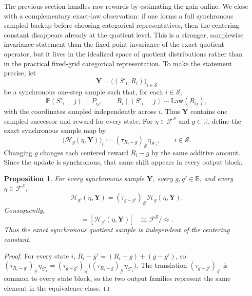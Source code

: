 \documentclass{article}
\newtheorem{proposition}[theorem]{Proposition}
\newcommand{\X}{\mathcal{S}}
\newcommand{\R}{\mathbb{R}}
\begin{document}
The previous section handles raw rewards by estimating the gain online. We close with a complementary exact-law observation: if one forms a full synchronous sampled backup before choosing categorical representatives, then the centering constant disappears already at the quotient level. This is a stronger, samplewise invariance statement than the fixed-point invariance of the exact quotient operator, but it lives in the idealized space of quotient distributions rather than in the practical fixed-grid categorical representation. To make the statement precise, let
\begin{equation}
\mathbf Y = \bigl((S'_i, R_i)\bigr)_{i \in \X}
\end{equation}
be a synchronous one-step sample such that, for each $i \in \X$,
\begin{equation}
\mathbb P(S'_i = j) = P_{ij},\qquad R_i \mid (S'_i=j) \sim \mathrm{Law}(R_{ij}),
\end{equation}
with the coordinates sampled independently across $i$. Thus $\mathbf Y$ contains one sampled successor and reward for every state. For $\eta \in \mathcal F^\X$ and $g \in \R$, define the exact synchronous sample map by
\begin{equation}
\bigl(\mathcal H_g(\eta, \mathbf Y)\bigr)_i := (\tau_{R_i -g})_\#\eta_{S'_i},\qquad i\in \X.
\end{equation}
Changing $g$ changes each centered reward $R_i-g$ by the same additive amount. Since the update is synchronous, that same shift appears in every output block.
\begin{proposition}\label{prop:sync-gain-free}
For every synchronous sample $\mathbf Y$, every $g, g' \in \R$, and every $\eta \in \mathcal F^\X$,
\begin{equation}
\mathcal H_{g'}(\eta, \mathbf Y) = (\tau_{g-g'})_\# \mathcal H_{g}(\eta, \mathbf Y).
\end{equation}
Consequently,
\begin{equation}
[\mathcal H_g(\eta, \mathbf Y)] = [\mathcal H_{g'}(\eta, \mathbf Y)]\quad \text{in } \mathcal F^\X / \approx.
\end{equation}
Thus the exact synchronous quotient sample is independent of the centering constant.
\end{proposition}
\begin{proof}
For every state $i$, $R_i - g' = (R_i - g) + (g-g')$, so $(\tau_{R_i - g'})_\# \eta_{S'_i} = (\tau_{g-g'})_\# \bigl((\tau_{R_i -g})_\# \eta_{S'_i} \bigr)$. The translation $(\tau_{g-g'})_\#$ is common to every state block, so the two output families represent the same element in the equivalence class.
\end{proof}
\end{document}
